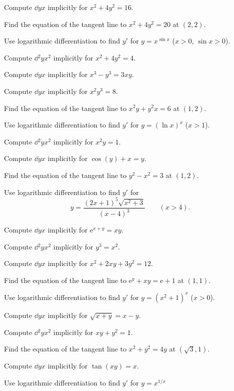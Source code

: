 \begin{problems}
  \item Compute $\dd{y}{x}$ implicitly for $x^{2}+4y^{2}=16$.
  \item Find the equation of the tangent line to $x^{2}+4y^{2}=20$ at
        $(2,2)$.
  \item Use logarithmic differentiation to find $y'$ for $y=x^{\sin x}$
        ($x>0$, $\sin x>0$).
  \item Compute $\dd{^{2}y}{x^{2}}$ implicitly for $x^{2}+4y^{2}=4$.
  \item Compute $\dd{y}{x}$ implicitly for $x^{3}-y^{3}=3xy$.
  \item Compute $\dd{y}{x}$ implicitly for $x^{2}y^{3}=8$.
  \item Find the equation of the tangent line to $x^{2}y+y^{2}x=6$ at
        $(1,2)$.
  \item Use logarithmic differentiation to find $y'$ for $y=(\ln x)^{x}$
        ($x>1$).
  \item Compute $\dd{^{2}y}{x^{2}}$ implicitly for $x^{2}y=1$.
  \item Compute $\dd{y}{x}$ implicitly for $\cos(y)+x=y$.
  \item Find the equation of the tangent line to $y^{2}-x^{2}=3$ at
        $(1,2)$.
  \item Use logarithmic differentiation to find $y'$ for
        \[
          y=\frac{(2x+1)^{5}\sqrt{x^{2}+3}}{(x-4)^{3}}\qquad (x>4).
        \]
  \item Compute $\dd{y}{x}$ implicitly for $\mathrm{e}^{x+y}=xy$.
  \item Compute $\dd{^{2}y}{x^{2}}$ implicitly for $y^{3}=x^{2}$.
  \item Compute $\dd{y}{x}$ implicitly for $x^{2}+2xy+3y^{2}=12$.
  \item Find the equation of the tangent line to $\mathrm{e}^{y}+xy=\mathrm{e}+1$
        at $(1,1)$.
  \item Use logarithmic differentiation to find $y'$ for $y=(x^{2}+1)^{x}$
        ($x>0$).
  \item Compute $\dd{y}{x}$ implicitly for $\sqrt{x+y}=x-y$.
  \item Compute $\dd{^{2}y}{x^{2}}$ implicitly for $xy+y^{2}=1$.
  \item Find the equation of the tangent line to $x^{2}+y^{2}=4y$ at
        $(\sqrt{3},1)$.
  \item Compute $\dd{y}{x}$ implicitly for $\tan(xy)=x$.
  \item Use logarithmic differentiation to find $y'$ for $y=x^{1/x}$

\end{problems}
